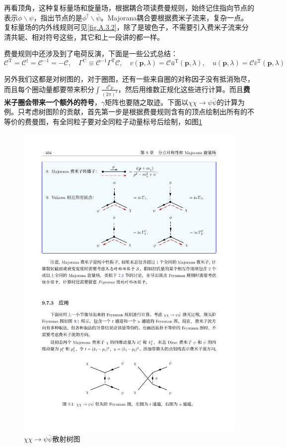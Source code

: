 再看顶角，这种复标量场和旋量场，根据耦合项读费曼规则，始终记住指向节点的表示$\phi\backslash\psi$，指出节点的是$\phi^{\dagger}\backslash\bar\psi$。Majorana耦合要根据费米子流来，复杂一点。复标量场的内外线规则可见\ref{fig.A.3.2}，除了是玻色子，不需要引入费米子流来分清共轭、相对符号这些，其它和上一段讲的都一样。

费曼规则中还涉及到了电荷反演，下面是一些公式总结：
\begin{equation}
	\mathcal{C}^\mathrm{T}=\mathcal{C}^\dagger=\mathcal{C}^{-1}=-\mathcal{C},\quad
	\Gamma^{\mathrm{C}}\equiv\mathcal{C}^{-1}\Gamma^{\mathrm{T}}\mathcal{C},\quad v(\mathbf{p},\lambda)=\mathcal{C}\bar{u}^{\mathrm{T}}(\mathbf{p},\lambda),\quad u(\mathbf{p},\lambda)=\mathcal{C}\bar{v}^{\mathrm{T}}(\mathbf{p},\lambda)
\end{equation}

另外我们这都是对树图的，对于圈图，还有一些来自圈的对称因子没有抵消殆尽，而且每个圈动量都要带来积分$\int\frac{d^4p}{(2\pi)^4}$，然后用维数正规化这些进行计算。而且\textbf{费米子圈会带来一个额外的符号}，$\gamma$矩阵也要随之取迹。下面以$\chi\chi\to\psi\bar{\psi}$的计算为例。只考虑树图阶的贡献，首先第一步是根据费曼规则含有的顶点绘制出所有的不等价的费曼图，有全同粒子要对全同粒子动量标号后绘制，如图\ref{fig.A.3.3}
\begin{figure}[htbp]
	\centering
	\includegraphics{figs/fig21.pdf}
	\caption{$\chi\chi\to\psi\bar{\psi}$散射树图}
	\label{fig.A.3.3}
\end{figure}

